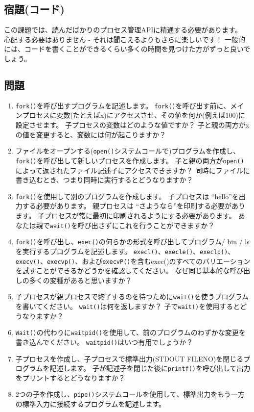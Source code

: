 \hypertarget{ux5bbfux984cux30b3ux30fcux30c9}{%
\subsection*{宿題(コード)}\label{ux5bbfux984cux30b3ux30fcux30c9}}

この課題では、読んだばかりのプロセス管理APIに精通する必要があります。
心配する必要はありません - それは聞こえるよりもさらに楽しいです！
一般的には、コードを書くことができるくらい多くの時間を見つけた方がずっと良いでしょう。

\hypertarget{ux554fux984c}{%
\subsection*{問題}\label{ux554fux984c}}

\begin{enumerate}
\def\labelenumi{\arabic{enumi}.}
\tightlist
\item
  \texttt{fork()}を呼び出すプログラムを記述します。
  \texttt{fork()}を呼び出す前に、メインプロセスに変数(たとえばx)にアクセスさせ、その値を何か(例えば100)に設定させます。
  子プロセスの変数はどのような値ですか？
  子と親の両方がxの値を変更すると、変数には何が起こりますか？
\item
  ファイルをオープンする(\texttt{open()}システムコールで)プログラムを作成し、\texttt{fork()}を呼び出して新しいプロセスを作成します。
  子と親の両方が\texttt{open()}によって返されたファイル記述子にアクセスできますか？
  同時にファイルに書き込むとき、つまり同時に実行するとどうなりますか？
\item
  \texttt{fork()}を使用して別のプログラムを作成します。 子プロセスは
  ``hello''を出力する必要があります。 親プロセスは
  ``さようなら''を印刷する必要があります。
  子プロセスが常に最初に印刷されるようにする必要があります。
  あなたは親で\texttt{wait()}を呼び出さずにこれを行うことができますか？
\item
  \texttt{fork()}を呼び出し、\texttt{exec()}の何らかの形式を呼び出してプログラム/
  bin / lsを実行するプログラムを記述します。
  \texttt{execl()}、\texttt{execle()}、\texttt{execlp()}、\texttt{execv()}、\texttt{execvp()}、および\texttt{execvP()}を含むexec()のすべてのバリエーションを試すことができるかどうかを確認してください。
  なぜ同じ基本的な呼び出しの多くの変種があると思いますか？
\item
  子プロセスが親プロセスで終了するのを待つために\texttt{wait()}を使うプログラムを書いてください。
  \texttt{wait()}は何を返しますか？
  子で\texttt{wait()}を使用するとどうなりますか？
\item
  \texttt{Wait()}の代わりに\texttt{waitpid()}を使用して、前のプログラムのわずかな変更を書き込んでください。
  \texttt{waitpid()}はいつ有用でしょうか？
\item
  子プロセスを作成し、子プロセスで標準出力(STDOUT
  FILENO)を閉じるプログラムを記述します。
  子が記述子を閉じた後に\texttt{printf()}を呼び出して出力をプリントするとどうなりますか？
\item
  2つの子を作成し、\texttt{pipe()}システムコールを使用して、標準出力をもう一方の標準入力に接続するプログラムを記述します。
\end{enumerate}

